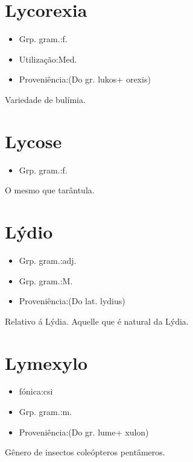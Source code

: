 \section{Lycorexia}
\begin{itemize}
\item {Grp. gram.:f.}
\end{itemize}
\begin{itemize}
\item {Utilização:Med.}
\end{itemize}
\begin{itemize}
\item {Proveniência:(Do gr. \textunderscore lukos\textunderscore  + \textunderscore orexis\textunderscore )}
\end{itemize}
Variedade de bulímia.
\section{Lycose}
\begin{itemize}
\item {Grp. gram.:f.}
\end{itemize}
O mesmo que \textunderscore tarântula\textunderscore .
\section{Lýdio}
\begin{itemize}
\item {Grp. gram.:adj.}
\end{itemize}
\begin{itemize}
\item {Grp. gram.:M.}
\end{itemize}
\begin{itemize}
\item {Proveniência:(Do lat. \textunderscore lydius\textunderscore )}
\end{itemize}
Relativo á Lýdia.
Aquelle que é natural da Lýdia.
\section{Lymexylo}
\begin{itemize}
\item {fónica:csi}
\end{itemize}
\begin{itemize}
\item {Grp. gram.:m.}
\end{itemize}
\begin{itemize}
\item {Proveniência:(Do gr. \textunderscore lume\textunderscore  + \textunderscore xulon\textunderscore )}
\end{itemize}
Gênero de insectos coleópteros pentâmeros.
